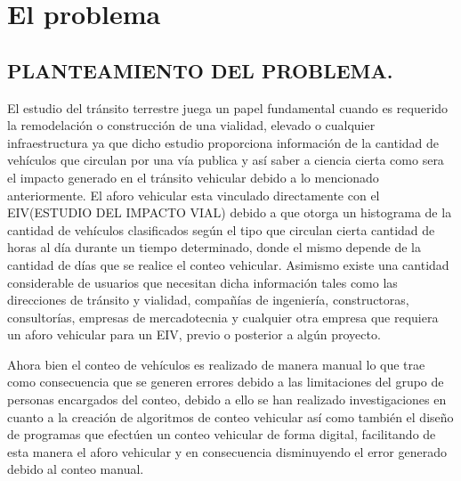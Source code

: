 
\chapter{El problema} %

\label{Capitulo1} %


\section{PLANTEAMIENTO DEL PROBLEMA.}

El estudio del tr\'ansito terrestre juega un papel fundamental cuando es requerido la remodelación o construcción de una vialidad, elevado o cualquier infraestructura ya que dicho estudio proporciona información de la cantidad de vehículos que circulan por una vía publica y así saber a ciencia cierta como sera el impacto generado en el tr\'ansito vehicular debido a lo mencionado anteriormente. El aforo vehicular esta vinculado directamente con el  EIV(ESTUDIO DEL IMPACTO VIAL) debido a que otorga un histograma de la cantidad de vehículos clasificados según el tipo que circulan cierta cantidad de horas al día durante un tiempo determinado, donde el mismo depende de la cantidad de días que se realice el conteo vehicular. Asimismo existe una cantidad considerable de usuarios que necesitan dicha información tales como las direcciones de tránsito y vialidad, compañías de ingeniería, constructoras, consultorías, empresas de mercadotecnia y cualquier otra empresa que requiera un aforo vehicular para un EIV, previo o posterior a algún proyecto.

Ahora bien el conteo de vehículos es realizado de manera manual lo que trae como consecuencia que se generen errores debido a las limitaciones del grupo de personas encargados del conteo, debido a ello se han realizado investigaciones en cuanto a la creación de algoritmos de conteo vehicular  así como también el diseño de programas que efectúen un conteo vehicular de forma digital, facilitando de esta manera el aforo vehicular y en consecuencia disminuyendo el error generado debido al conteo manual.

